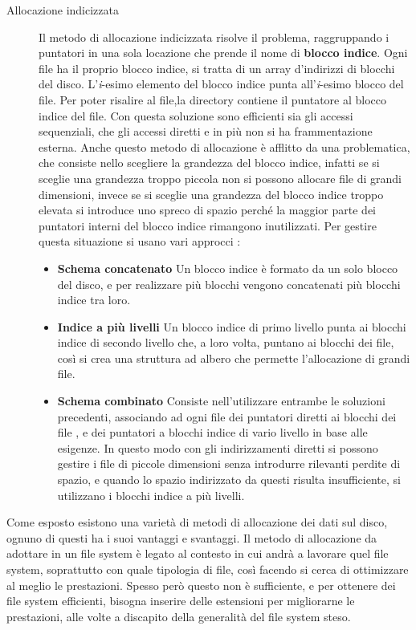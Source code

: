       \begin{description}
        \item[Allocazione indicizzata]
        Il metodo di allocazione indicizzata risolve il problema, raggruppando i puntatori in una sola locazione che prende il nome di {\bf blocco indice}. Ogni file ha il proprio blocco indice, si tratta di un array  d'indirizzi di blocchi del disco. L'\textit{i}-esimo elemento del blocco indice punta all'\textit{i}-esimo blocco del file. Per poter risalire al file,la directory contiene il puntatore al blocco indice del file. Con questa soluzione sono efficienti sia gli accessi sequenziali,  che gli accessi diretti e in più non si ha frammentazione esterna.
        Anche questo metodo di allocazione è afflitto da una problematica, che consiste nello scegliere la grandezza del blocco indice, infatti se si sceglie una grandezza troppo piccola non si possono allocare file di grandi dimensioni, invece se si sceglie una grandezza del blocco indice troppo elevata si introduce uno spreco di spazio perché la maggior parte dei puntatori interni del blocco indice rimangono inutilizzati. 
        Per gestire questa situazione si usano vari approcci : 
        \begin{itemize}
         \item \textbf{Schema concatenato} Un blocco indice è formato da un solo blocco del disco, e per realizzare più blocchi vengono concatenati più blocchi indice tra loro.
        \end{itemize}
        \begin{itemize}
         \item \textbf{Indice a più livelli} Un blocco indice di primo livello punta ai blocchi indice di secondo livello che, a loro volta, puntano ai blocchi dei file, così si crea una struttura ad albero che permette l'allocazione di grandi file.
        \end{itemize}
        \begin{itemize}
         \item \textbf{Schema combinato} Consiste nell'utilizzare entrambe le soluzioni precedenti, associando ad ogni file dei puntatori diretti ai blocchi dei file , e dei puntatori a blocchi indice di vario livello in base alle esigenze. In questo modo con gli indirizzamenti diretti si possono gestire i file di piccole dimensioni senza introdurre rilevanti perdite di spazio, e quando lo spazio indirizzato da questi risulta insufficiente, si utilizzano i blocchi indice a più livelli. 
        \end{itemize}
        \end{description}
         Come esposto esistono una varietà di metodi di allocazione dei dati sul disco, ognuno di questi ha i suoi vantaggi e svantaggi. Il metodo di allocazione da adottare in un file system  è legato al  contesto in cui andrà a lavorare quel file system, soprattutto con quale tipologia di file, così facendo  si cerca di ottimizzare al meglio le prestazioni.
         Spesso però questo non è sufficiente, e per ottenere dei file system efficienti, bisogna inserire delle estensioni per migliorarne le prestazioni, alle volte a discapito della generalità del file system steso.
